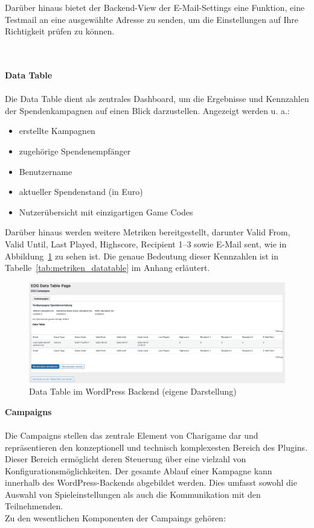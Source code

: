 Darüber hinaus bietet der Backend-View der E-Mail-Settings eine Funktion, eine Testmail an eine ausgewählte Adresse zu senden, um die Einstellungen auf Ihre Richtigkeit prüfen zu können.

\\\\
\textbf{Data Table}\\\\
Die Data Table dient als zentrales Dashboard, um die Ergebnisse und Kennzahlen der Spendenkampagnen auf einen Blick darzustellen.
Angezeigt werden u. a.:
\begin{itemize}
    \item erstellte Kampagnen
    \item zugehörige Spendenempfänger
    \item Benutzername
    \item aktueller Spendenstand (in Euro)
    \item Nutzerübersicht mit einzigartigen Game Codes
\end{itemize}
Darüber hinaus werden weitere Metriken bereitgestellt, darunter Valid From, Valid Until, Last Played, Highscore, Recipient 1–3 sowie E-Mail sent, wie in Abbildung~\ref{fig:datatable-backend-legacy} zu sehen ist.
Die genaue Bedeutung dieser Kennzahlen ist in Tabelle~\ref{tab:metriken_datatable} im Anhang erläutert.

\begin{figure}[H]
    \centering
    \includegraphics[width=1\textwidth]{images/legacy_datatable_backend}
    \caption{Data Table im WordPress Backend (eigene Darstellung)}
    \label{fig:datatable-backend-legacy}
\end{figure}

\newpage
\textbf{Campaigns}\\\\
Die Campaigns stellen das zentrale Element von Charigame dar und repräsentieren den konzeptionell und technisch komplexesten Bereich des Plugins.
Dieser Bereich ermöglicht deren Steuerung über eine vielzahl von Konfigurationsmöglichkeiten.
Der gesamte Ablauf einer Kampagne kann innerhalb des WordPress-Backends abgebildet werden.
Dies umfasst sowohl die Auswahl von Spieleinstellungen als auch die Kommunikation mit den Teilnehmenden.
\\
Zu den wesentlichen Komponenten der Campaings gehören:

